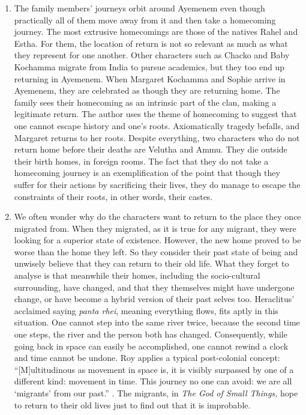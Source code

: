 \begin{enumerate}
  \item The family members' journeys orbit around Ayemenem even though practically all of them move away from it and then take a homecoming journey. The most extrusive homecomings are those of the natives Rahel and Estha. For them, the location of return is not so relevant as much as what they represent for one another. Other characters such as Chacko and Baby Kochamma migrate from India to pursue academics, but they too end up returning in Ayemenem. When Margaret Kochamma and Sophie arrive in Ayemenem, they are celebrated as though they are returning home. The family sees their homecoming as an intrinsic part of the clan, making a legitimate return. The author uses the theme of homecoming to suggest that one cannot escape history and one's roots. Axiomatically tragedy befalls, and Margaret returns to her roots. Despite everything, two characters who do not return home before their deaths are Velutha and Ammu. They die outside their birth homes, in foreign rooms. The fact that they do not take a homecoming journey is an exemplification of the point that though they suffer for their actions by sacrificing their lives, they do manage to escape the constraints of their roots, in other words, their castes. 

  \item We often wonder why do the characters want to return to the place they once migrated from. When they migrated, as it is true for any migrant, they were looking for a superior state of existence. However, the new home proved to be worse than the home they left. So they consider their past state of being and unwisely believe that they can return to their old life. What they forget to analyse is that meanwhile their homes, including the socio-cultural surrounding, have changed, and that they themselves might have undergone change, or have become a hybrid version of their past selves too. Heraclitus' acclaimed saying \emph{panta rhei}, meaning everything flows, fits aptly in this situation. One cannot step into the same river twice, because the second time one steps, the river and the person both has changed. Consequently, while going back in space can easily be accomplished, one cannot rewind a clock and time cannot be undone. Roy applies a typical post-colonial concept: ``[M]ultitudinous as movement in space is, it is visibly surpassed by one of a different kind: movement in time. This journey no one can avoid: we are all `migrants' from our past.'' \parencite[164]{Santaollalla1994}. The migrants,  in \emph{The God of Small Things,} hope to return to their old lives just to find out that it is improbable.


\end{enumerate}
